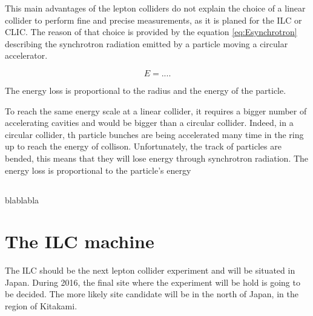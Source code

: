     This main advantages of the lepton colliders do not explain the choice of a linear collider to perform fine and precise measurements, as it is planed for the ILC or CLIC.
    The reason of that choice is provided by the equation \ref{eq:Esynchrotron} describing the synchrotron radiation emitted by a particle moving a circular accelerator.
    
    \begin{equation}
     E = ....
       \label{eq:Esynchrotron}
    \end{equation} 

    The energy loss is proportional to the radius and the energy of the particle.



    To reach the same energy scale at a linear collider, it requires a bigger number of accelerating cavities and would be bigger than a circular collider.
    Indeed, in a circular collider, th particle bunches are being accelerated many time in the ring up to reach the energy of collison.
    Unfortunately, the track of particles are bended, this means that they will lose energy through synchrotron radiation. 
    The energy loss is proportional to the particle's energy
    

    
    \subsection{ }
  
  blablabla

  \section{The ILC machine}
  
    The ILC should be the next lepton collider experiment and will be situated in Japan.
    During 2016, the final site where the experiment will be hold is going to be decided.
    The more likely site candidate will be in the north of Japan, in the region of Kitakami. 
    
